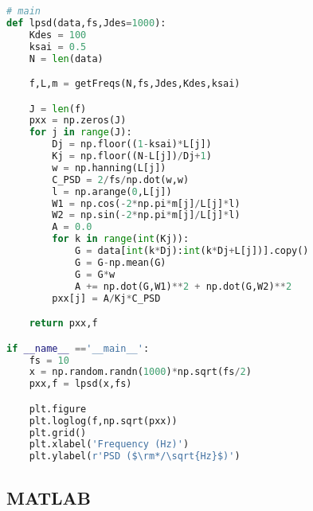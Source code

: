 \begin{lstlisting}[language=Python]
# main
def lpsd(data,fs,Jdes=1000):
    Kdes = 100
    ksai = 0.5
    N = len(data)

    f,L,m = getFreqs(N,fs,Jdes,Kdes,ksai)

    J = len(f)
    pxx = np.zeros(J)
    for j in range(J):
        Dj = np.floor((1-ksai)*L[j])
        Kj = np.floor((N-L[j])/Dj+1)
        w = np.hanning(L[j])
        C_PSD = 2/fs/np.dot(w,w)
        l = np.arange(0,L[j])
        W1 = np.cos(-2*np.pi*m[j]/L[j]*l)
        W2 = np.sin(-2*np.pi*m[j]/L[j]*l)
        A = 0.0
        for k in range(int(Kj)):
            G = data[int(k*Dj):int(k*Dj+L[j])].copy()
            G = G-np.mean(G)
            G = G*w
            A += np.dot(G,W1)**2 + np.dot(G,W2)**2
        pxx[j] = A/Kj*C_PSD

    return pxx,f

if __name__ =='__main__':
    fs = 10
    x = np.random.randn(1000)*np.sqrt(fs/2)
    pxx,f = lpsd(x,fs)

    plt.figure
    plt.loglog(f,np.sqrt(pxx))
    plt.grid()
    plt.xlabel('Frequency (Hz)')
    plt.ylabel(r'PSD ($\rm*/\sqrt{Hz}$)')
\end{lstlisting}


\subsection{MATLAB}

